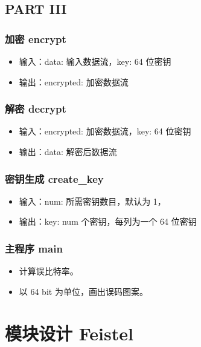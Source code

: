 \documentclass[UTF8]{ctexart}
\begin{document}
\subsection{PART III}

\subsubsection{加密 encrypt}

\begin{itemize}
        \item 输入：data: 输入数据流，key: 64 位密钥
        \item 输出：encrypted: 加密数据流
\end{itemize}

\subsubsection{解密 decrypt}

\begin{itemize}
        \item 输入：encrypted: 加密数据流，key: 64 位密钥
        \item 输出：data: 解密后数据流
\end{itemize}

\subsubsection{密钥生成 create\_key}

\begin{itemize}
        \item 输入：num: 所需密钥数目，默认为 1，
        \item 输出：key: num 个密钥，每列为一个 64 位密钥
\end{itemize}

\subsubsection{主程序 main}

\begin{itemize}
        \item 计算误比特率。
        \item 以 64 bit 为单位，画出误码图案。
\end{itemize}


\section{模块设计 Feistel}
\end{document}
